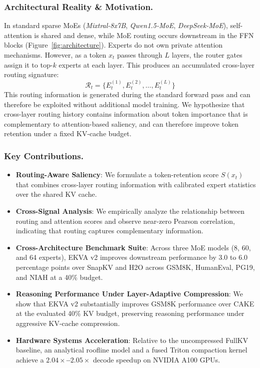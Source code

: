 \documentclass[runningheads]{llncs}
\begin{document}
\subsubsection{Architectural Reality \& Motivation.}
In standard sparse MoEs (\emph{Mixtral-8x7B}, \emph{Qwen1.5-MoE}, \emph{DeepSeek-MoE}), self-attention is shared and dense, while MoE routing occurs downstream in the FFN blocks (Figure~\ref{fig:architecture}). Experts do not own private attention mechanisms. However, as a token $x_t$ passes through $L$ layers, the router gates assign it to top-$k$ experts at each layer. This produces an accumulated cross-layer routing signature:
\begin{equation}
    \mathcal{R}_t = \{ E_t^{(1)}, E_t^{(2)}, \dots, E_t^{(L)} \}
\end{equation}
This routing information is generated during the standard forward pass and can therefore be exploited without additional model training. We hypothesize that cross-layer routing history contains information about token importance that is complementary to attention-based saliency, and can therefore improve token retention under a fixed KV-cache budget.

\subsubsection{Key Contributions.}
\begin{itemize}
    \item \textbf{Routing-Aware Saliency}: We formulate a token-retention score $S(x_t)$ that combines cross-layer routing information with calibrated expert statistics over the shared KV cache.
    \item \textbf{Cross-Signal Analysis}: We empirically analyze the relationship between routing and attention scores and observe near-zero Pearson correlation, indicating that routing captures complementary information.
    \item \textbf{Cross-Architecture Benchmark Suite}: Across three MoE models (8, 60, and 64 experts), EKVA v2 improves downstream performance by 3.0 to 6.0 percentage points over SnapKV and H2O across GSM8K, HumanEval, PG19, and NIAH at a 40\% budget.
    \item \textbf{Reasoning Performance Under Layer-Adaptive Compression}: We show that EKVA v2 substantially improves GSM8K performance over CAKE at the evaluated 40\% KV budget, preserving reasoning performance under aggressive KV-cache compression.
    \item \textbf{Hardware Systems Acceleration}: Relative to the uncompressed FullKV baseline, an analytical roofline model and a fused Triton compaction kernel achieve a \textbf{$2.04\times$--$2.05\times$} decode speedup on NVIDIA A100 GPUs.
\end{itemize}
\end{document}

